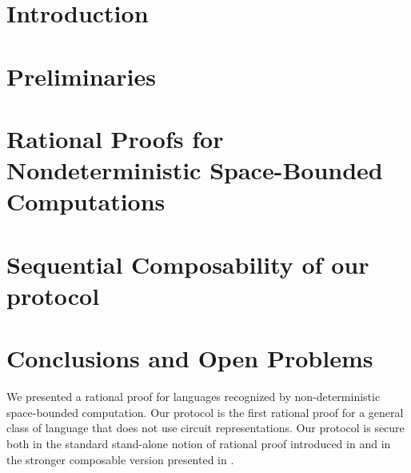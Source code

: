 \documentclass{llncs}
\begin{document}
\section{Introduction}


\section{Preliminaries}


%


\section{Rational Proofs for Nondeterministic Space-Bounded Computations }


\section{Sequential Composability of our protocol}




\section{Conclusions and Open Problems}
We presented a rational proof for languages recognized by non-deterministic space-bounded computation. Our protocol is the first rational proof for a general class of language that does not use circuit representations. Our protocol is secure both in the standard stand-alone notion of rational proof introduced in 
\cite{am} and in the stronger composable version presented in \cite{cg15}. 
\end{document}

